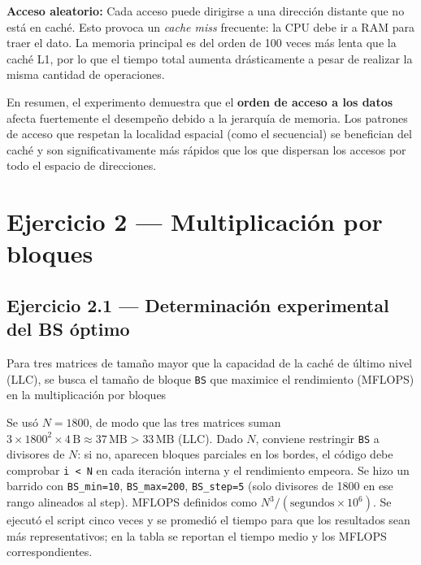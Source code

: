 \documentclass[11pt,a4paper]{article}
\begin{document}
\textbf{Acceso aleatorio:} Cada acceso puede dirigirse a una dirección distante que no está en caché. Esto provoca un \emph{cache miss} frecuente: la CPU debe ir a RAM para traer el dato. La memoria principal es del orden de 100 veces más lenta que la caché L1, por lo que el tiempo total aumenta drásticamente a pesar de realizar la misma cantidad de operaciones.

En resumen, el experimento demuestra que el \textbf{orden de acceso a los datos} afecta fuertemente el desempeño debido a la jerarquía de memoria. Los patrones de acceso que respetan la localidad espacial (como el secuencial) se benefician del caché y son significativamente más rápidos que los que dispersan los accesos por todo el espacio de direcciones.

\section*{Ejercicio 2 --- Multiplicación por bloques}

\subsection*{Ejercicio 2.1 --- Determinación experimental del BS óptimo}

Para tres matrices de tamaño mayor que la capacidad de la caché de último nivel (LLC), se busca el tamaño de bloque \texttt{BS} que maximice el rendimiento (MFLOPS) en la multiplicación por bloques 

Se usó \(N = 1800\), de modo que las tres matrices suman \(3 \times 1800^2 \times 4\,\text{B} \approx 37\,\text{MB} > 33\,\text{MB}\) (LLC). Dado \(N\), conviene restringir \texttt{BS} a divisores de \(N\): si no, aparecen bloques parciales en los bordes, el código debe comprobar \texttt{i < N} en cada iteración interna y el rendimiento empeora. Se hizo un barrido con \texttt{BS\_min=10}, \texttt{BS\_max=200}, \texttt{BS\_step=5} (solo divisores de 1800 en ese rango alineados al step). MFLOPS definidos como \(N^3 / (\text{segundos} \times 10^6)\). Se ejecutó el script cinco veces y se promedió el tiempo para que los resultados sean más representativos; en la tabla se reportan el tiempo medio y los MFLOPS correspondientes.
\end{document}

